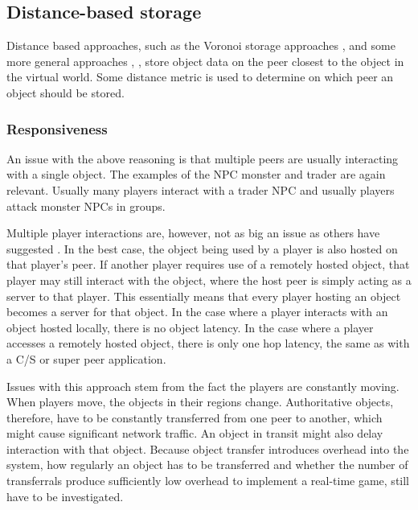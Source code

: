 \subsection{Distance-based storage}
\label{distance_based_storage}

Distance based approaches, such as the Voronoi storage approaches \cite{Buyukkaya_voronoi_state_management}, \cite{Hu_voronoi_IM} and some more general approaches \cite{colyseus_distance_based}, \cite{solipsis}, store object data on the peer closest to the object in the virtual world. Some distance metric is used to determine on which peer an object should be stored.

\subsubsection{Responsiveness}

An issue with the above reasoning is that multiple peers are usually interacting with a single object. The examples of the NPC monster and trader are again relevant. Usually many players interact with a trader NPC and usually players attack monster NPCs in groups.

Multiple player interactions are, however, not as big an issue as others have suggested \cite{Fan_deisgn_issues_p2p}. In the best case, the object being used by a player is also hosted on that player's peer. If another player requires use of a remotely hosted object, that player may still interact with the object, where the host peer is simply acting as a server to that player. This essentially means that every player hosting an object becomes a server for that object. In the case where a player interacts with an object hosted locally, there is no object latency. In the case where a player
accesses a remotely hosted object, there is only one hop latency, the same as with a C/S or super peer application.

Issues with this approach stem from the fact the players are constantly moving. When players move, the objects in their regions change. Authoritative objects, therefore, have to be constantly transferred from one peer to another, which might cause significant network traffic. An object in transit might also delay interaction with that object. Because object transfer introduces overhead into the system, how regularly an object has to be transferred and whether the number of transferrals produce sufficiently low overhead to implement a real-time game, still have to be investigated.

